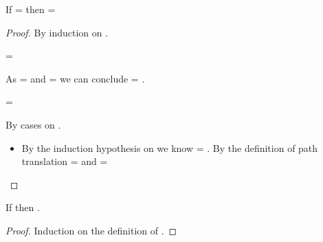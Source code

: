 \begin{lemma} \label{appendix:lemma:pathindependent}
  If \inopenvnoeq{\openv{}}{\object{}} = 
  then \inopenvnoeq{\openv{}}{\path{\pathelem{}}{\object{}}} =
 \begin{proof}
   By induction on \pathelem{}.
   \begin{case}[\pathelem{} = \emptypath{}]
     \inopenvnoeq{\openv{}}{\object{}} = {\inopenvnoeq{\openv{}}{\objectp{}}}

     As 
     \inopenvnoeq{\openv{}}{\path{\emptypath{}}{\object{}}} = \inopenvnoeq{\openv{}}{\object{}}
     and
     \inopenvnoeq{\openv{}}{\path{\emptypath{}}{\objectp{}}} = \inopenvnoeq{\openv{}}{\objectp{}}
     we can conclude 
     \inopenvnoeq{\openv{}}{\path{\emptypath{}}{\object{}}} = \inopenvnoeq{\openv{}}{\path{\emptypath{}}{\objectp{}}}.
   \end{case}
   \begin{case}[\pathelem{} = {\destructpath{\pesyntax{}}{\pathelem{1}}}]
     \inopenvnoeq{\openv{}}{\object{}} = {\inopenvnoeq{\openv{}}{\objectp{}}}

     By cases on \pesyntax{}.

     \begin{itemize}
       \item[]
   \begin{subcase}[\pesyntax{} = {\keype{\k{}}}] 

     By the induction hypothesis on {}
     we know {} =
             {}.
             By the definition of path translation 
             {} = {\getexp {{\openv{}}(\object{})}{\k{}}}
             and 
             {} = {\getexp {{\openv{}}(\objectp{})}{\k{}}}
   \end{subcase} 
     \end{itemize}
   \end{case}
 \end{proof}
\end{lemma}

\begin{lemma}[\classconst]\label{appendix:lemma:classconst}
  If
  {\opsem{\openv{}}{\appexp{\classconst{}}{\openv{}({\path{\pathelem{}}{\x{}}})}}{\class{}}} then
  {\satisfies{\openv{}}{\isprop{\class{}}{\path{\pathelem{}}{\x{}}}}}.

  \begin{proof}
    Induction on the definition of {\classconst{}}.
  \end{proof}
\end{lemma}


